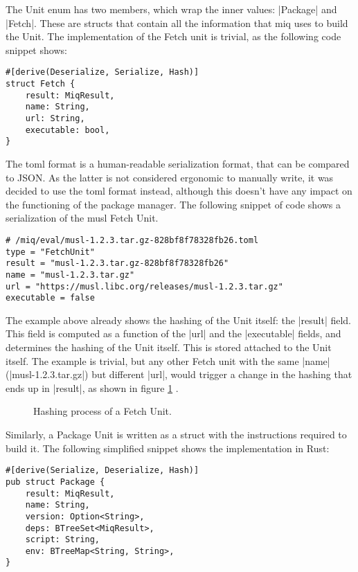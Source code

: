 The Unit enum has two members, which wrap the inner values:
|Package| and |Fetch|. These are structs that contain all
the information that miq uses to build the Unit. The
implementation of the Fetch unit is trivial, as the
following code snippet shows:

\begin{verbatim}
#[derive(Deserialize, Serialize, Hash)]
struct Fetch {
    result: MiqResult,
    name: String,
    url: String,
    executable: bool,
}
\end{verbatim}

The toml format is a human-readable serialization format,
that can be compared to JSON. As the latter is not
considered ergonomic to manually write, it was decided to
use the toml format instead, although this doesn't have any
impact on the functioning of the package manager. The
following snippet of code shows a serialization of the musl
Fetch Unit.

\begin{verbatim}
# /miq/eval/musl-1.2.3.tar.gz-828bf8f78328fb26.toml
type = "FetchUnit"
result = "musl-1.2.3.tar.gz-828bf8f78328fb26"
name = "musl-1.2.3.tar.gz"
url = "https://musl.libc.org/releases/musl-1.2.3.tar.gz"
executable = false
\end{verbatim}

The example above already shows the hashing of the Unit
itself: the |result| field. This field is computed as a
function of the |url| and the |executable| fields, and
determines the hashing of the Unit itself. This is stored
attached to the Unit itself. The example is trivial, but
any other Fetch unit with the same |name|
(|musl-1.2.3.tar.gz|) but different |url|, would trigger a
change in the hashing that ends up in |result|, as shown in
figure \ref{fig:fetch_hash} .

\begin{figure}[hbt]
    \centerfloat
    
    \caption{Hashing process of a Fetch Unit.}
    \label{fig:fetch_hash}
\end{figure}

Similarly, a Package Unit is written as a struct with the
instructions required to build it. The following simplified
snippet shows the implementation in Rust:

\begin{verbatim}
#[derive(Serialize, Deserialize, Hash)]
pub struct Package {
    result: MiqResult,
    name: String,
    version: Option<String>,
    deps: BTreeSet<MiqResult>,
    script: String,
    env: BTreeMap<String, String>,
}
\end{verbatim}

